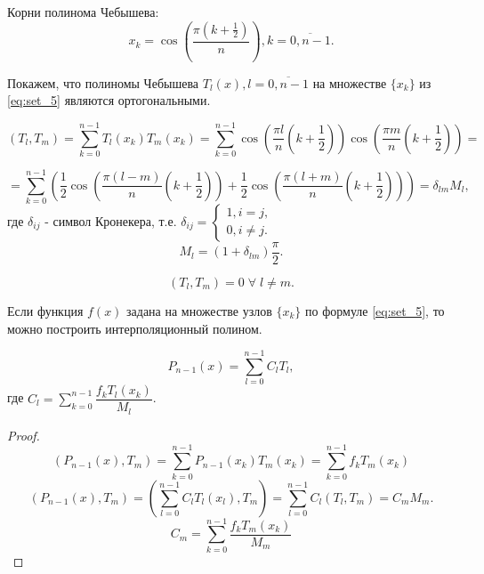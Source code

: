 Корни полинома Чебышева:
\begin{equation}\label{eq:set_5}
  x_k = \cos \left( \dfrac{\pi \left(k + \frac{1}{2}\right)}{n} \right), k = \overline{0, n - 1}.
\end{equation}

Покажем, что полиномы Чебышева $T_l (x), l = \overline{0, n - 1}$ на множестве $\{ x_k \}$ из \eqref{eq:set_5} являются ортогональными.

\begin{equation*}
  \left( T_l, T_m \right) = \sum\limits_{k = 0}^{n-1} T_l (x_k) T_m (x_k) = \sum\limits_{k = 0}^{n-1} \cos \left( \dfrac{\pi l}{n} \left(k + \frac{1}{2}\right) \right) \cos \left( \dfrac{\pi m}{n} \left(k + \frac{1}{2}\right) \right) =
\end{equation*}

\begin{equation*}
  = \sum\limits_{k = 0}^{n-1} \left( \dfrac{1}{2} \cos\left( \dfrac{\pi (l - m)}{n} \left(k + \frac{1}{2}\right) \right)
  + \dfrac{1}{2} \cos\left( \dfrac{\pi (l + m)}{n} \left(k + \frac{1}{2}\right) \right)  \right) = \delta_{lm} M_l,
\end{equation*}
где $\delta_{ij}$ - символ Кронекера, т.е. $ \delta_{ij} = \begin{cases} 1, i = j, \\ 0, i \ne j. \end{cases}$
\begin{equation*}
  M_l = (1 + \delta_{lm}) \dfrac{\pi}{2}.
\end{equation*}

\begin{equation*}
  (T_l, T_m) = 0 \; \forall \; l \ne m.
\end{equation*}

Если функция $f(x)$ задана на множестве узлов $\{ x_k \}$ по формуле \eqref{eq:set_5}, то можно построить интерполяционный полином.

\begin{equation}\label{eq:cheb_8}
  P_{n-1}(x) = \sum\limits_{l = 0}^{n-1} C_l T_l,
\end{equation}
где $C_l = \sum\limits_{k = 0}^{n-1} \dfrac{f_k T_l (x_k)}{M_l}$.

\begin{proof}
  \begin{equation*}
    \left( P_{n-1}(x), T_m \right) = \sum\limits_{k = 0}^{n-1} P_{n-1}(x_k) T_m (x_k) = \sum\limits_{k = 0}^{n-1} f_k T_m(x_k)
  \end{equation*}
  \begin{equation*}
    \left( P_{n-1}(x), T_m \right) =( \sum\limits_{l = 0}^{n-1} C_l T_l (x_l), T_m ) = \sum\limits_{l = 0}^{n-1} C_l (T_l, T_m) = C_m M_m.
  \end{equation*}
  \begin{equation*}
	C_m = \sum\limits_{k = 0}^{n-1} \dfrac{f_k T_m (x_k)}{M_m}
  \end{equation*}
\end{proof}

